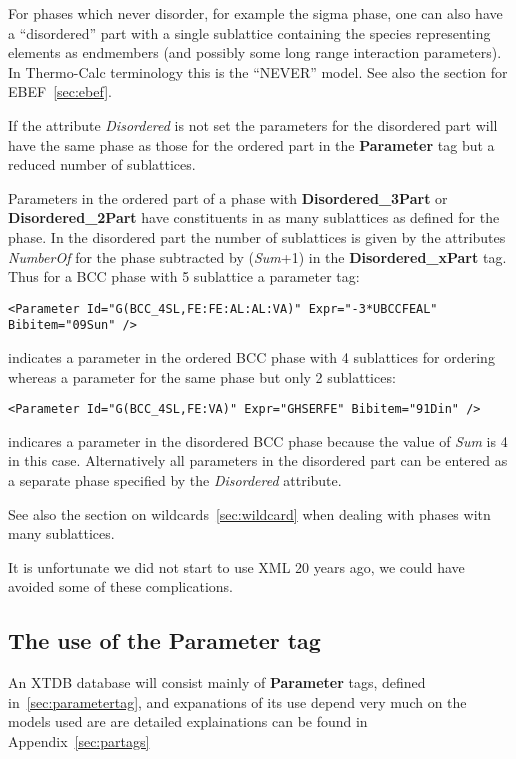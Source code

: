 \documentclass{article}
\begin{document}
For phases which never disorder, for example the sigma phase, one can
also have a ``disordered'' part with a single sublattice containing
the species representing elements as endmembers (and possibly some
long range interaction parameters).  In Thermo-Calc terminology this
is the ``NEVER'' model.  See also the section for EBEF~\ref{sec:ebef}.

If the attribute {\em Disordered} is not set the parameters for the
disordered part will have the same phase as those for the ordered part
in the {\bf Parameter} tag but a reduced number of sublattices.

Parameters in the ordered part of a phase with {\bf Disordered\_3Part}
or {\bf Disordered\_2Part} have constituents in as many sublattices as
defined for the phase.  In the disordered part the number of
sublattices is given by the attributes {\em NumberOf} for the phase
subtracted by ({\em Sum}+1) in the {\bf Disordered\_xPart} tag.  Thus for
a BCC phase with 5 sublattice a parameter tag:
\begin{verbatim}
<Parameter Id="G(BCC_4SL,FE:FE:AL:AL:VA)" Expr="-3*UBCCFEAL" Bibitem="09Sun" />
\end{verbatim}
indicates a parameter in the ordered BCC phase with 4 sublattices for
ordering whereas a parameter for the same phase but only 2 sublattices:
\begin{verbatim}
<Parameter Id="G(BCC_4SL,FE:VA)" Expr="GHSERFE" Bibitem="91Din" />
\end{verbatim}
indicares a parameter in the disordered BCC phase because the value of
{\em Sum} is 4 in this case.  Alternatively all parameters in the
disordered part can be entered as a separate phase specified by the
{\em Disordered} attribute.

See also the section on wildcards~\ref{sec:wildcard} when dealing
with phases witn many sublattices.

It is unfortunate we did not start to use XML 20 years ago, we could
have avoided some of these complications.

\subsection{The use of the Parameter tag}

An XTDB database will consist mainly of {\bf Parameter} tags, defined
in~\ref{sec:parametertag}, and expanations of its use depend very much
on the models used are are detailed explainations can be found in
Appendix~\ref{sec:partags}
\end{document}
